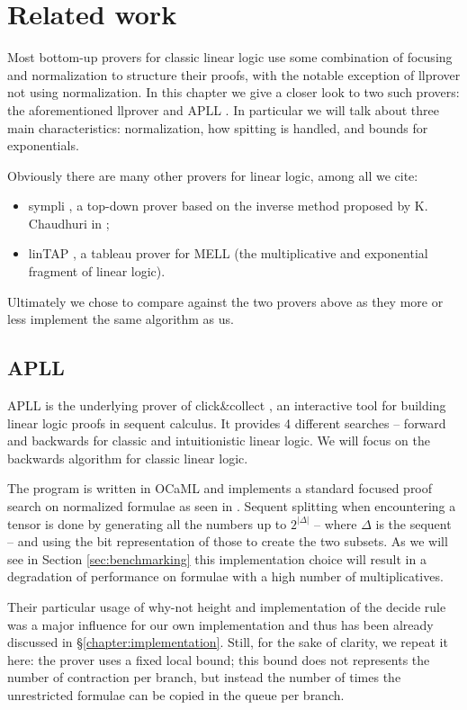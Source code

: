 \chapter{Related work}\label{chapter:related work}
Most bottom-up provers for classic linear logic use some combination of focusing and normalization to structure their proofs, with the notable exception of llprover \cite{llprover} not using normalization.	%
In this chapter we give a closer look to two such provers: the aforementioned llprover and APLL \cite{APLL}.
In particular we will talk about three main characteristics: normalization, how spitting is handled, and bounds for exponentials.

Obviously there are many other provers for linear logic, among all we cite: 
\begin{itemize}
	\item sympli \cite{sympli}, a top-down prover based on the inverse method proposed by K. Chaudhuri in \cite{inverse};
	\item linTAP \cite{linTAPwebsite, linTAP}, a tableau prover for MELL (the multiplicative and exponential fragment of linear logic).
\end{itemize}
Ultimately we chose to compare against the two provers above as they more or less implement the same algorithm as us.

\section{APLL}\label{sec:apll}
APLL is the underlying prover of click\&collect \cite{clickAndCollect}, an interactive tool for building linear logic proofs in sequent calculus.
It provides 4 different searches -- forward and backwards for classic and intuitionistic linear logic. 
We will focus on the backwards algorithm for classic linear logic.

The program is written in OCaML and implements a standard focused proof search on normalized formulae as seen in \cite{LiangMiller}.
Sequent splitting when encountering a tensor is done by generating all the numbers up to $2^{|\Delta|}$ -- where $\Delta$ is the sequent -- and using the bit representation of those to create the two subsets.
As we will see in Section \ref{sec:benchmarking} this implementation choice will result in a degradation of performance on formulae with a high number of multiplicatives.

Their particular usage of why-not height and implementation of the decide rule was a major influence for our own implementation and thus has been already discussed in \S\ref{chapter:implementation}.
Still, for the sake of clarity, we repeat it here: the prover uses a fixed local bound; this bound does not represents the number of contraction per branch, but instead the number of times the unrestricted formulae can be copied in the queue per branch.

